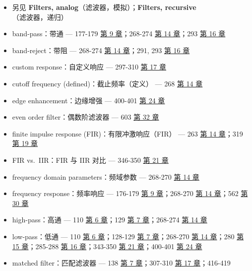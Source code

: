 \begin{itemize}
  \begin{itemize}
  \tightlist
  \item
    另见 \textbf{Filters, analog}（滤波器，模拟）；\textbf{Filters,
    recursive}（滤波器，递归）
  \item
    band-pass：带通 --- 177-179  \hyperref[ch-09]{第 9
    章}；268-274  \hyperref[ch-14]{第 14 章}；293 
    \hyperref[ch-16]{第 16 章}
  \item
    band-reject：带阻 --- 268-274  \hyperref[ch-14]{第 14
    章}；291, 293  \hyperref[ch-16]{第 16 章}
  \item
    custom response：自定义响应 --- 297-310 
    \hyperref[ch-17]{第 17 章}
  \item
    cutoff frequency (defined)：截止频率（定义） --- 268 
    \hyperref[ch-14]{第 14 章}
  \item
    edge enhancement：边缘增强 --- 400-401 
    \hyperref[ch-24]{第 24 章}
  \item
    even order filter：偶数阶滤波器 --- 603 
    \hyperref[ch-32]{第 32 章}
  \item
    finite impulse response (FIR)：有限冲激响应（FIR） --- 263
     \hyperref[ch-14]{第 14 章}；319 
    \hyperref[ch-19]{第 19 章}
  \item
    FIR vs.~IIR：FIR 与 IIR 对比 --- 346-350 
    \hyperref[ch-21]{第 21 章}
  \item
    frequency domain parameters：频域参数 --- 268-270 
    \hyperref[ch-14]{第 14 章}
  \item
    frequency response：频率响应 --- 176-179 
    \hyperref[ch-09]{第 9 章}；268-270  \hyperref[ch-14]{第 14
    章}；562  \hyperref[ch-30]{第 30 章}
  \item
    high-pass：高通 --- 110  \hyperref[ch-06]{第 6 章}；129
     \hyperref[ch-07]{第 7 章}；268-274 
    \hyperref[ch-14]{第 14 章}
  \item
    low-pass：低通 --- 110  \hyperref[ch-06]{第 6 章}；128-129
     \hyperref[ch-07]{第 7 章}；268-270 
    \hyperref[ch-14]{第 14 章}；280  \hyperref[ch-15]{第 15
    章}；285-288  \hyperref[ch-16]{第 16 章}；343-350
     \hyperref[ch-21]{第 21 章}；400-401 
    \hyperref[ch-24]{第 24 章}
  \item
    matched filter：匹配滤波器 --- 138  \hyperref[ch-07]{第 7
    章}；307-310  \hyperref[ch-17]{第 17 章}；416-419

\end{itemize}
\end{itemize}
